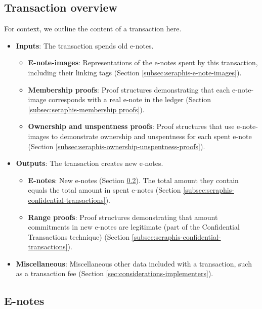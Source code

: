 \subsection{Transaction overview}
\label{subsec:seraphis-transaction-overview}

For context, we outline the content of a transaction here.

\begin{itemize}
    \item \textbf{Inputs}: The transaction spends old e-notes.
    \begin{itemize}
        \item \textbf{E-note-images}: Representations of the e-notes spent by this transaction, including their linking tags (Section \ref{subsec:seraphis-e-note-images}).
        \item \textbf{Membership proofs}: Proof structures demonstrating that each e-note-image corresponds with a real e-note in the ledger (Section \ref{subsec:seraphis-membership proofs}).
        \item \textbf{Ownership and unspentness proofs}: Proof structures that use e-note-images to demonstrate ownership and unspentness for each spent e-note (Section \ref{subsec:seraphis-ownership-unspentness-proofs}).
    \end{itemize}
    \item \textbf{Outputs}: The transaction creates new e-notes.
    \begin{itemize}
        \item \textbf{E-notes}: New e-notes (Section \ref{subsec:seraphis-e-notes}). The total amount they contain equals the total amount in spent e-notes (Section \ref{subsec:seraphis-confidential-transactions}).
        \item \textbf{Range proofs}: Proof structures demonstrating that amount commitments in new e-notes are legitimate (part of the Confidential Transactions technique) (Section \ref{subsec:seraphis-confidential-transactions}).
    \end{itemize}
    \item \textbf{Miscellaneous}: Miscellaneous other data included with a transaction, such as a transaction fee (Section \ref{sec:considerations-implementers}).
\end{itemize}


\subsection{E-notes}
\label{subsec:seraphis-e-notes}

